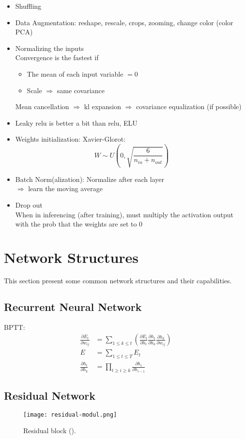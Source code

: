 \begin{itemize}
	\item Shuffling
	\item Data Augmentation: reshape, rescale, crops, zooming, change color (color \ac{PCA})
	\item Normalizing the inputs\\
	Convergence is the fastest if
	\begin{itemize}
		\item The mean of each input variable $=0$
		\item Scale $\Rightarrow$ same covariance
	\end{itemize}
	Mean cancellation $\Rightarrow$ \ac{kl} expansion $\Rightarrow$ covariance equalization (if possible)
	\item Leaky \ac{relu} is better a bit than \ac{relu}, ELU
	\item Weights initialization: Xavier-Glorot:
	\[ W \sim U\left(0, \sqrt{\frac{6}{n_{in} + n_{out}}}\right) \]
	\item Batch Norm(alization): Normalize after each layer\\
	$\Rightarrow$ learn the moving average
	\item Drop out\\
	\note When in inferencing (after training), must multiply the activation output with the \ac{prob} that the weights are set to 0
\end{itemize}

\section{Network Structures}
This section present some common network structures and their capabilities.

\subsection{Recurrent Neural Network}
\ac{BPTT}:\\
\begin{align}
	\frac{\partial E_t}{\partial w_{ij}} &= \sum_{1 \leq k \leq t} \left( \frac{\partial E_t}{\partial h_t} \frac{\partial h_t}{\partial h_k} \frac{\partial h_k}{\partial w_{ij}} \right)\\
	E &= \sum_{1 \leq t \leq T} E_t\\
	\frac{\partial h_t}{\partial h_k} &= \prod_{t \geq i \geq k} \frac{\partial h_i}{\partial h_{i-1}}
\end{align}

\subsection{Residual Network}
\begin{figure}[hbt!]
	\centering
	\texttt{[image: residual-modul.png]}
	\caption{Residual block (\href{https://www.google.com}{\todo{}}).}
\end{figure}